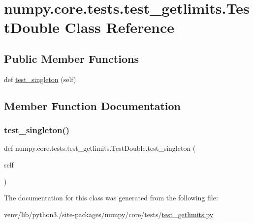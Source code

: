 \hypertarget{classnumpy_1_1core_1_1tests_1_1test__getlimits_1_1TestDouble}{}\section{numpy.\+core.\+tests.\+test\+\_\+getlimits.\+Test\+Double Class Reference}
\label{classnumpy_1_1core_1_1tests_1_1test__getlimits_1_1TestDouble}
\subsection*{Public Member Functions}
\begin{DoxyCompactItemize}
\item 
def \hyperlink{classnumpy_1_1core_1_1tests_1_1test__getlimits_1_1TestDouble_aa2c0d2fa88558d364d12449ae9423b53}{test\+\_\+singleton} (self)
\end{DoxyCompactItemize}


\subsection{Member Function Documentation}
\mbox{\label{classnumpy_1_1core_1_1tests_1_1test__getlimits_1_1TestDouble_aa2c0d2fa88558d364d12449ae9423b53}} 
\subsubsection{\texorpdfstring{test\+\_\+singleton()}{test\_singleton()}}
{\footnotesize\ttfamily def numpy.\+core.\+tests.\+test\+\_\+getlimits.\+Test\+Double.\+test\+\_\+singleton (\begin{DoxyParamCaption}\item[{}]{self }\end{DoxyParamCaption})}



The documentation for this class was generated from the following file\+:\begin{DoxyCompactItemize}
\item 
venv/lib/python3./site-\/packages/numpy/core/tests/\hyperlink{test__getlimits_8py}{test\+\_\+getlimits.\+py}\end{DoxyCompactItemize}
